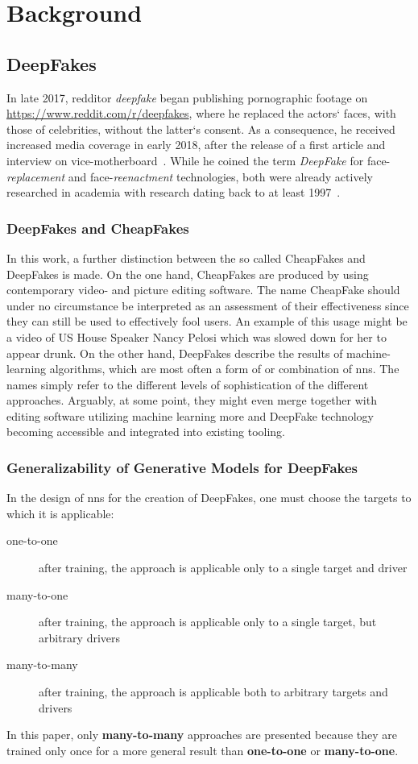 \section{Background}\label{sect:background}
\subsection{DeepFakes}\label{subsect:deepfakes}
In late 2017, \gls{redditor} \textit{deepfake} began publishing pornographic footage
on \url{https://www.reddit.com/r/deepfakes}, where he replaced the actors` faces,
with those of celebrities, without the latter`s consent. As a consequence, he
received increased media coverage in early 2018, after the release of a first 
article and interview on vice-motherboard~\cite{Cole.2017}. While he coined the
term \textit{DeepFake} for face-\textit{replacement} and face-\textit{reenactment}
technologies, both were already actively researched in academia with research 
dating back to at least 1997~\cite{Bregler.1997}.

\subsubsection{DeepFakes and CheapFakes}
In this work, a further distinction between the so called CheapFakes and DeepFakes
is made. On the one hand, CheapFakes are produced by using contemporary video- 
and picture editing software. The name CheapFake should under no circumstance be
interpreted as an assessment of their effectiveness since they can still be used
to effectively fool users. An example of this usage might be a video of US House
Speaker Nancy Pelosi which was slowed down for her to appear drunk.
On the other hand, DeepFakes describe the results of machine-learning algorithms,
which are most often a form of or combination of \glspl{nn}.
The names simply refer to the different levels of sophistication of the different
approaches. Arguably, at some point, they might even merge together with editing 
software utilizing machine learning more and DeepFake technology becoming accessible 
and integrated into existing tooling.

\subsubsection{Generalizability of Generative Models for DeepFakes}
In the design of \glspl{nn} for the creation of DeepFakes, one must choose the
targets to which it is applicable:
\begin{description}
    \item[one-to-one] after training, the approach is applicable only to a
    single target and driver
    \item[many-to-one] after training, the approach is applicable only to a
    single target, but arbitrary drivers
    \item[many-to-many] after training, the approach is applicable both to
    arbitrary targets and drivers
\end{description}\cite[cf.][]{Mirsky.2020}
In this paper, only \textbf{many-to-many} approaches are presented because they
are trained only once for a more general result than \textbf{one-to-one} or
\textbf{many-to-one}.

